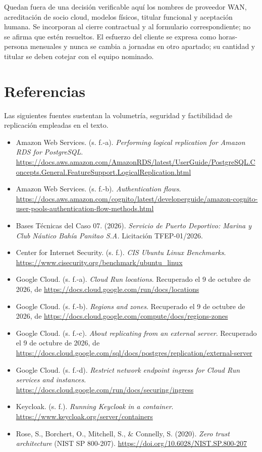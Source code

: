 \documentclass[11pt,letterpaper]{report}
\begin{document}
Quedan fuera de una decisión verificable aquí los nombres de proveedor WAN, acreditación de socio cloud, modelos físicos, titular funcional y aceptación humana. Se incorporan al cierre contractual y al formulario correspondiente; no se afirma que estén resueltos. El esfuerzo del cliente se expresa como horas-persona mensuales y nunca se cambia a jornadas en otro apartado; su cantidad y titular se deben cotejar con el equipo nominado.

\section*{Referencias}

Las siguientes fuentes sustentan la volumetría, seguridad y factibilidad de replicación empleadas en el texto.

\begin{itemize}
\item Amazon Web Services. (s. f.-a). \textit{Performing logical replication for Amazon RDS for PostgreSQL}. \url{https://docs.aws.amazon.com/AmazonRDS/latest/UserGuide/PostgreSQL.Concepts.General.FeatureSupport.LogicalReplication.html}
\item Amazon Web Services. (s. f.-b). \textit{Authentication flows}. \url{https://docs.aws.amazon.com/cognito/latest/developerguide/amazon-cognito-user-pools-authentication-flow-methods.html}
\item Bases Técnicas del Caso 07. (2026). \textit{Servicio de Puerto Deportivo: Marina y Club Náutico Bahía Panitao S.A.} Licitación TFEP-01/2026.
\item Center for Internet Security. (s. f.). \textit{CIS Ubuntu Linux Benchmarks}. \url{https://www.cisecurity.org/benchmark/ubuntu_linux}
\item Google Cloud. (s. f.-a). \textit{Cloud Run locations}. Recuperado el 9 de octubre de 2026, de \url{https://docs.cloud.google.com/run/docs/locations}
\item Google Cloud. (s. f.-b). \textit{Regions and zones}. Recuperado el 9 de octubre de 2026, de \url{https://docs.cloud.google.com/compute/docs/regions-zones}
\item Google Cloud. (s. f.-c). \textit{About replicating from an external server}. Recuperado el 9 de octubre de 2026, de \url{https://docs.cloud.google.com/sql/docs/postgres/replication/external-server}
\item Google Cloud. (s. f.-d). \textit{Restrict network endpoint ingress for Cloud Run services and instances}. \url{https://docs.cloud.google.com/run/docs/securing/ingress}
\item Keycloak. (s. f.). \textit{Running Keycloak in a container}. \url{https://www.keycloak.org/server/containers}
\item Rose, S., Borchert, O., Mitchell, S., \& Connelly, S. (2020). \textit{Zero trust architecture} (NIST SP 800-207). \url{https://doi.org/10.6028/NIST.SP.800-207}
\end{itemize}
\end{document}

